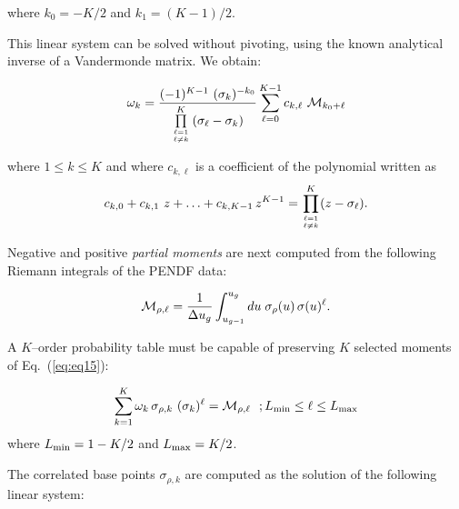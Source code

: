 \noindent where $k_0=-K/2$ and $k_1=(K-1)/2$.

\vskip 0.1cm

This linear system can be solved without pivoting, using the known analytical
inverse of a Vandermonde matrix. We obtain:

\begin{equation}
\omega_k={(-1)^{K-1} \ (\sigma_k)^{-k_0}\over \prod\limits_{\ell=1\atop \ell
\neq k}^K \left( \sigma_\ell-\sigma_k\right)}
\sum_{\ell=0}^{K-1} c_{k,\ell} \ {\cal M}_{k_0+\ell}
\label{eq:eq13}
\end{equation}

\noindent where $1\le k \le K$ and where $c_{k,\ell}$ is a coefficient of the
polynomial written as
\begin{equation}
c_{k,0}+c_{k,1} \ z+\ldots+c_{k,K-1} \, z^{K-1}=\prod\limits_{\ell=1\atop \ell
\neq k}^K (z-\sigma_\ell).
\label{eq:eq14}
\end{equation}

\vskip 0.1cm

Negative and positive {\sl partial moments} are next computed from the
following Riemann integrals of the PENDF data:

\begin{equation}
{\cal M}_{\rho,\ell}={1 \over \Delta u_g}\int_{u_{g-1}}^{u_g} du \;
\sigma_\rho(u) \, \sigma(u)^\ell.
\label{eq:eq15}
\end{equation}

\vskip 0.1cm

A $K$--order probability table must be capable of preserving $K$ selected
moments of Eq.~(\ref{eq:eq15}):

\begin{equation}
\sum_{k=1}^K \omega_k \, \sigma_{\rho,k} \ (\sigma_k)^\ell={\cal M}_{\rho,\ell}
\  \ ; L_{\rm min}\le \ell \le L_{\rm max}
\label{eq:eq16}
\end{equation}
\noindent where $L_{\rm min}=1-K/2$ and $L_{\rm max}=K/2$.

The correlated base points $\sigma_{\rho,k}$ are computed as the solution of
the following linear system:


